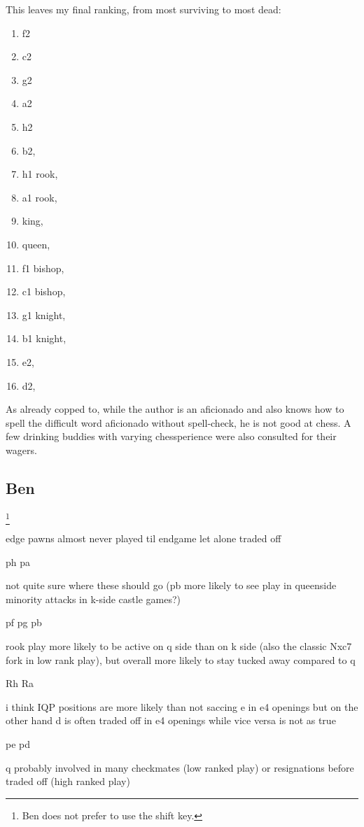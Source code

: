 \documentclass[twocolumn]{article}
\begin{document}
This leaves my final ranking, from most surviving to most dead:

\begin{enumerate}
\item  f2
\item  c2
\item  g2
\item  a2
\item  h2
\item  b2,
\item  h1 rook,
\item  a1 rook,
\item  king,
\item  queen,
\item  f1 bishop,
\item  c1 bishop,
\item  g1 knight,
\item  b1 knight,
\item  e2,
\item  d2,
\end{enumerate}

As already copped to, while the author is an aficionado and also knows
how to spell the difficult word aficionado without spell-check, he is
not good at chess. A few drinking buddies with varying chessperience were
also consulted for their wagers.

\subsection{Ben}\footnote{Ben does not prefer to use the shift key.}

edge pawns almost never played til endgame let alone traded off

ph
pa

not quite sure where these should go (pb more likely to see play in
queenside minority attacks in k-side castle games?)

pf
pg
pb

rook play more likely to be active on q side than on k side (also the
classic Nxc7 fork in low rank play), but overall more likely to stay
tucked away compared to q

Rh
Ra

i think IQP positions are more likely than not saccing e in e4 openings
but on the other hand d is often traded off in e4 openings while vice
versa is not as true

pe
pd

q probably involved in many checkmates (low ranked play) or resignations
before traded off (high ranked play)
\end{document}
